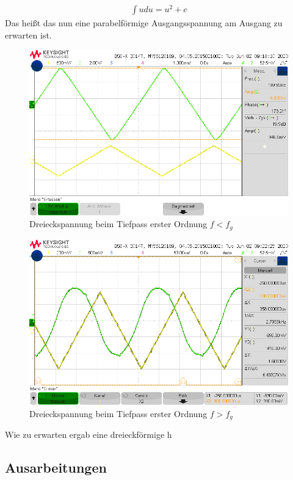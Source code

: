 \begin{align}
    \int{u du} = u^2 + c
\end{align}
Das heißt das nun eine parabelförmige Ausgangsspannung am Ausgang zu erwarten ist.

\begin{figure}[H]
    \centering
    \includegraphics[width=\costumPicWidth]{Lab_2/Messungen/TP_first_order/scope_30.png}
    \caption{Dreieckspannung beim Tiefpass erster Ordnung $f < f_g$}
    \label{fig:Dreieck_Tiefpass_erster_Ordnung_small_f}
\end{figure}
\begin{figure}[H]
    \centering
    \includegraphics[width=\costumPicWidth]{Lab_2/Messungen/TP_first_order/scope_34.png}
    \caption{Dreieckspannung beim Tiefpass erster Ordnung $f > f_g$}
    \label{fig:Dreieck_Tiefpass_erster_Ordnung_big_f}
\end{figure}
Wie zu erwarten ergab eine dreieckförmige h
\subsection{Ausarbeitungen}

